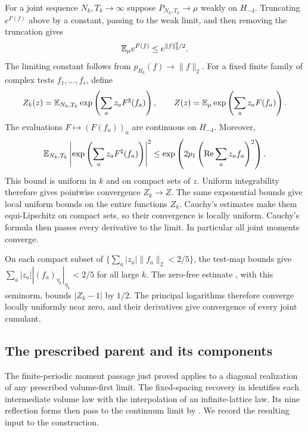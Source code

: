 For a joint sequence $N_k,T_k\to\infty$ suppose
$P_{N_k,T_k}\to\mu$ weakly on $H_{-4}$. Truncating $e^{F(f)}$
above by a constant, passing to the weak limit, and then removing
the truncation gives
\begin{equation}\label{eq:limit-continuum-G}
 \mathbb E_\mu e^{F(f)}\le e^{\|f\|_2^2/2}.
\end{equation}
The limiting constant follows from $p_{R_k}(f)\to\|f\|_2$.
For a fixed finite family of complex tests $f_1,\ldots,f_s$, define
\[
 Z_k(z)=\mathbb E_{N_k,T_k}\exp\left(\sum_a z_aF^\sharp(f_a)\right),
 \qquad
 Z(z)=\mathbb E_\mu\exp\left(\sum_a z_aF(f_a)\right).
\]
The evaluations $F\mapsto(F(f_a))_a$ are continuous on $H_{-4}$.
Moreover,
\[
 \mathbb E_{N_k,T_k}\left|\exp\left(\sum_a z_aF^\sharp(f_a)\right)\right|^2
 \le\exp\left(2p_1\left(\operatorname{Re}\sum_a z_af_a\right)^2\right).
\]
This bound is uniform in $k$ and on compact sets of $z$.
Uniform integrability therefore gives pointwise convergence
$Z_k\to Z$. The same exponential bounds give local uniform
bounds on the entire functions $Z_k$. Cauchy's estimates make them
equi-Lipschitz on compact sets, so their convergence is locally
uniform. Cauchy's formula then passes every derivative to the limit.
In particular all joint moments converge.

On each compact subset of
$\{\sum_a|z_a|\|f_a\|_2<2/5\}$, the test-map bounds give
$\sum_a|z_a||(f_a)_{\eta_k}|_{\eta_k}<2/5$ for all large $k$.
The zero-free estimate , with this
seminorm, bounds $|Z_k-1|$ by $1/2$. The principal logarithms
therefore converge locally uniformly near zero, and their
derivatives give convergence of every joint cumulant.

\subsection{The prescribed parent and its components}

The finite-periodic moment passage just proved applies to a
diagonal realization of any prescribed volume-first limit.
The fixed-spacing recovery in \cite[Proposition~7.3]{ContinuumLimits}
identifies each intermediate volume law with the interpolation
of an infinite-lattice law. Its nine reflection forms then pass
to the continuum limit by \cite[Corollary~7.4]{ContinuumLimits}.
We record the resulting input to the construction.


